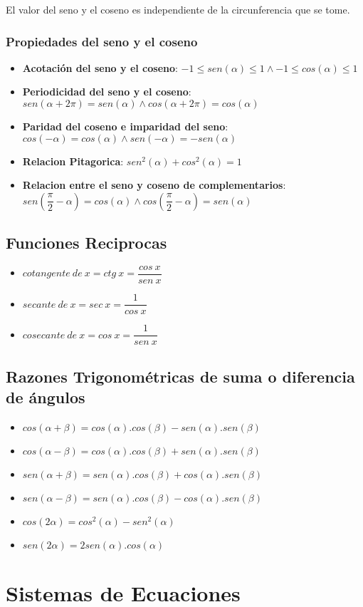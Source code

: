 \documentclass[10pt]{article}
\begin{document}
El valor del seno y el coseno es independiente de la circunferencia que se tome.
\subsubsection{Propiedades del seno y el coseno}
\begin{itemize}
\item \textbf{Acotación del seno y el coseno}: $-1 \leq sen(\alpha) \leq 1 \land -1 \leq cos(\alpha) \leq 1$
\item \textbf{Periodicidad del seno y el coseno}: $sen(\alpha + 2\pi) = sen(\alpha) \land cos(\alpha + 2\pi) = cos(\alpha)$
\item \textbf{Paridad del coseno e imparidad del seno}: $cos(-\alpha) = cos(\alpha) \land sen(-\alpha) = -sen(\alpha)$
\item \textbf{Relacion Pitagorica}: $sen^2(\alpha)+cos^2(\alpha) = 1$
\item \textbf{Relacion entre el seno y coseno de complementarios}: $sen \left(\dfrac{\pi}{2} - \alpha \right) = cos(\alpha) \land cos\left(\dfrac{\pi}{2}-\alpha \right) = sen(\alpha)$
\end{itemize}
\subsection{Funciones Reciprocas}
\begin{itemize}
\item $cotangente\ de\ x = ctg\ x = \dfrac{cos\ x}{sen\ x}$
\item $secante\ de\ x = sec\ x = \dfrac{1}{cos\ x}$
\item $cosecante\ de\ x = cos\ x = \dfrac{1}{sen\ x}$
\end{itemize}

\subsection{Razones Trigonométricas de suma o diferencia de ángulos}
\begin{itemize}
\item $cos\left(\alpha + \beta \right) = cos(\alpha).cos(\beta)-sen(\alpha).sen(\beta)$
\item $cos\left(\alpha - \beta \right) = cos(\alpha).cos(\beta)+sen(\alpha).sen(\beta)$
\item $sen\left(\alpha + \beta \right) = sen(\alpha).cos(\beta)+cos(\alpha).sen(\beta)$
\item $sen\left(\alpha - \beta \right) = sen(\alpha).cos(\beta)-cos(\alpha).sen(\beta)$
\item $cos(2\alpha) = cos^2(\alpha)-sen^2(\alpha)$
\item $sen(2\alpha) = 2sen(\alpha).cos(\alpha)$
\end{itemize}

\section{Sistemas de Ecuaciones}
\end{document}
